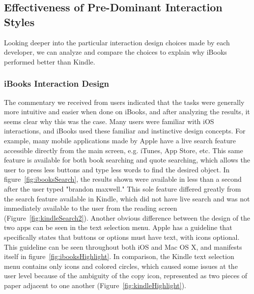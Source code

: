 \documentclass[journal, a4paper]{IEEEtran}
\begin{document}
\subsection{Effectiveness of Pre-Dominant Interaction Styles}
	Looking deeper into the particular interaction design choices made by each developer, we can analyze and compare the choices to explain why iBooks performed better than Kindle.
\subsubsection{iBooks Interaction Design}
	The commentary we received from users indicated that the tasks were generally more intuitive and easier when done on iBooks, and after analyzing the results, it seems clear why this was the case. Many users were familiar with iOS interactions, and iBooks used these familiar and instinctive design concepts. For example, many mobile applications made by Apple have a live search feature accessible directly from the main screen, e.g. iTunes, App Store, etc. This same feature is available for both book searching and quote searching, which allows the user to press less buttons and type less words to find the desired object. In figure~\ref{fig:ibooksSearch}, the results shown were available in less than a second after the user typed "brandon maxwell." This sole feature differed greatly from the search feature available in Kindle, which did not have live search and was not immediately available to the user from the reading screen (Figure~\ref{fig:kindleSearch2}).
    Another obvious difference between the design of the two apps can be seen in the text selection menu. Apple has a guideline that specifically states that buttons or options must have text, with icons optional. This guideline can be seen throughout both iOS and Mac OS X, and manifests itself in figure~\ref{fig:ibooksHighlight}. In comparison, the Kindle text selection menu contains only icons and colored circles, which caused some issues at the user level because of the ambiguity of the copy icon, represented as two pieces of paper adjacent to one another (Figure~\ref{fig:kindleHighlight}).
    
\end{document}
